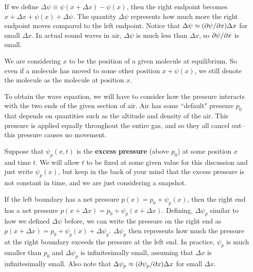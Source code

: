 If we define $\Delta\psi \equiv \psi(x + \Delta x) - \psi(x)$, then the right endpoint becomes $x + \Delta x + \psi(x) + \Delta \psi$. The quantity $\Delta \psi$ represents how much more the right endpoint moves compared to the left endpoint. Notice that $\Delta \psi \approx (\partial \psi/\partial x)\Delta x$ for small $\Delta x$. In actual sound waves in air, $\Delta \psi$ is much less than $\Delta x$, so $\partial \psi/\partial x$ is small.

We are considering $x$ to be the position of a given molecule at equilibrium. So even if a molecule has moved to some other position $x + \psi(x)$, we still denote the molecule as the molecule at position $x$.

To obtain the wave equation, we will have to consider how the pressure interacts with the two ends of the given section of air. Air has some ``default" pressure $p_0$ that depends on quantities such as the altitude and density of the air. This pressure is applied equally throughout the entire gas, and so they all cancel out--this pressure causes no movement.

Suppose that $\psi_p(x,t)$ is the \textbf{excess pressure} (above $p_0$) at some position $x$ and time $t$. We will allow $t$ to be fixed at some given value for this discussion and just write $\psi_p(x)$, but keep in the back of your mind that the excess pressure is not constant in time, and we are just considering a snapshot. 

If the left boundary has a net pressure $p(x) = p_0 + \psi_p(x)$, then the right end has a net pressure $p(x + \Delta x) = p_0 + \psi_p(x + \Delta x)$. Defining, $\Delta \psi_p$ similar to how we defined $\Delta \psi$ before, we can write the pressure on the right end as $p(x + \Delta x) = p_0 + \psi_p(x) + \Delta \psi_p$. $\Delta \psi_p$ then represents how much the pressure at the right boundary exceeds the pressure at the left end. In practice, $\psi_p$ is much smaller than $p_0$ and $\Delta \psi_p$ is infinitesimally small, assuming that $\Delta x$ is infinitesimally small. Also note that $\Delta \psi_p \approx (\partial \psi_p/\partial x)\Delta x$ for small $\Delta x$.

